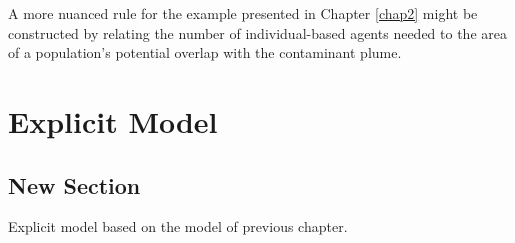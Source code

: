 

A more nuanced rule for the example presented in
Chapter \ref{chap2} might be constructed by relating the number of
individual-based agents needed to the area of a population's potential
overlap with the contaminant plume.



\chapter[Explicit Model]{Explicit Model} \label{explicitmodel}

\section{New Section}
Explicit model based on the model of previous chapter.
